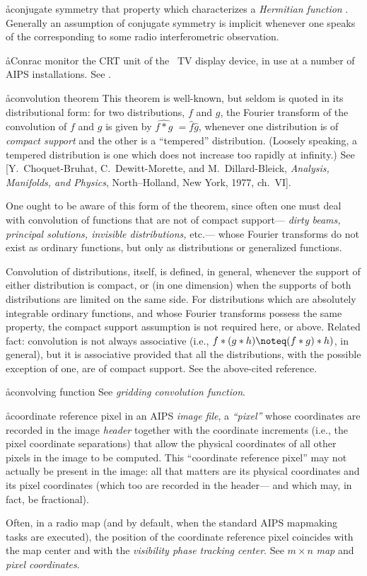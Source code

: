 \aa{conjugate symmetry}
that property which characterizes a {\it Hermitian function} \qv.
Generally an assumption of conjugate symmetry is implicit
whenever one speaks of the 
corresponding to some radio interferometric observation.

\aa{Conrac monitor}
the CRT unit of the \iis\ TV display device, in use at a number
of AIPS installations.
See {\it \iis}.


\aa{convolution theorem}
This theorem is well-known, but seldom is quoted in its distributional
form:  for two distributions, $f$ and $g$, the Fourier transform
of the convolution of $f$ and $g$ is given by
$\widehat{f\ast g} {\phantom{l}}=\hat f\hat g$, whenever one distribution
is of {\it compact support} and the other is a ``tempered'' distribution.
(Loosely speaking, a tempered distribution is one which does not
increase too rapidly at infinity.)
See [Y.~Choquet-Bruhat, C.~Dewitt-Morette, and M.~Dillard-Bleick,
{\it Analysis, Manifolds, and Physics}, North--Holland, New York,
1977, ch.~VI].
\par
One ought to be aware of this
form of the theorem, since often one must deal with convolution
of functions that are not of compact support---%
{\it dirty beams, principal solutions, invisible distributions,} etc.---%
whose Fourier transforms do not exist as ordinary functions,
but only as distributions or generalized functions.
\par
Convolution of distributions, itself, is defined, in general, whenever
the support of either distribution is compact, or (in one
dimension) when the supports of both distributions are limited
on the same side.
For distributions which are absolutely integrable ordinary functions,
and whose Fourier transforms possess the same property,
the compact support assumption is not required here, or above.
Related fact: convolution is not always associative
(i.e., $f\ast(g\ast h) \noteq (f\ast g)\ast h)$, in general),
but it is associative provided that all the distributions, with
the possible exception of one, are of compact support.
See the above-cited reference.

\aa{convolving function} See {\it gridding convolution function}.

\aa{coordinate reference pixel}
in an AIPS {\it image file}, a {\it ``pixel''} whose coordinates are
recorded in the image {\it header} together with the coordinate increments
(i.e., the pixel coordinate separations) that allow the physical
coordinates of all other pixels in the image to be computed.
This ``coordinate reference pixel'' may not actually be present in
the image: all that matters are its physical coordinates and its
pixel coordinates (which too are recorded in the header---%
and which may, in fact, be fractional).
\par
Often, in a radio map (and by default, when the standard AIPS mapmaking
tasks are executed), the position of the coordinate reference pixel
coincides with the map center and with the {\it visibility phase
tracking center}.
See $m\times n$ {\it map} and {\it pixel coordinates}.

